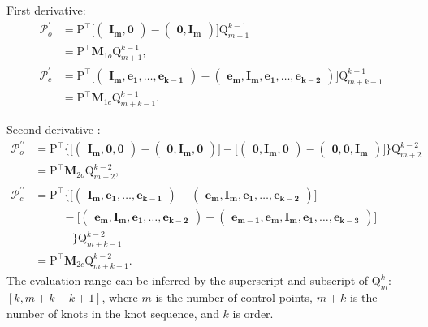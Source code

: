 \documentclass[11pt]{article}
\newcommand{\bmmp}{\bm{\mathcal{P}}} %
\newcommand{\vPT}{\bm{\mathrm{P}}^{\intercal}}
\newcommand{\vQ}{\bm{\mathrm{Q}}} %
\newcommand{\mM}{\mathbf{M}} %
\newcommand{\odml}{\begin{pmatrix}\bm{I_m},\bm{0}\end{pmatrix}}
\newcommand{\odmr}{\begin{pmatrix}\bm{0},\bm{I_m}\end{pmatrix}}
\newcommand{\cdml}{\begin{pmatrix}\bm{I_m},\bm{e_1},\dots,\bm{e_{k-1}}\end{pmatrix}}
\newcommand{\cdmr}{\begin{pmatrix}\bm{e_m},\bm{I_m},\bm{e_1},\dots,\bm{e_{k-2}}\end{pmatrix}}
\newcommand{\oddml}{\begin{pmatrix}\bm{I_m},\bm{0},\bm{0}\end{pmatrix}}
\newcommand{\oddmm}{\begin{pmatrix}\bm{0},\bm{I_m},\bm{0}\end{pmatrix}}
\newcommand{\oddmr}{\begin{pmatrix}\bm{0},\bm{0},\bm{I_m}\end{pmatrix}}
\newcommand{\cddml}{\begin{pmatrix}\bm{I_m},\bm{e_1},\dots,\bm{e_{k-1}}\end{pmatrix}}
\newcommand{\cddmm}{\begin{pmatrix}\bm{e_m},\bm{I_m},\bm{e_1},\dots,\bm{e_{k-2}}\end{pmatrix}}
\newcommand{\cddmr}{\begin{pmatrix}\bm{e_{m-1}},\bm{e_m},\bm{I_m},\bm{e_1},\dots,\bm{e_{k-3}}\end{pmatrix}}
\begin{document}
First derivative:
\[
\begin{split}
\bmmp_o^\prime &= \vPT \biggl[ \odml - \odmr \biggr] \vQ^{k-1}_{m+1} \\
&= \vPT \mM_{1o} \vQ^{k-1}_{m+1}, \\
\bmmp_c^\prime &= \vPT \biggl[ \cdml - \cdmr \biggr] \vQ^{k-1}_{m+k-1} \\
&= \vPT \mM_{1c} \vQ^{k-1}_{m+k-1}.
\end{split}
\]

Second derivative \label{second_derivative}:
\[
\begin{split}
\bmmp_o^{\prime\prime} &= \vPT \biggl\{
\biggl[ \oddml - \oddmm \biggr] 
-
\biggl[ \oddmm - \oddmr \biggr]
\biggr\}
\vQ^{k-2}_{m+2} \\
&= \vPT \mM_{2o} 
\vQ^{k-2}_{m+2},
\\
\bmmp_c^{\prime\prime} &= \vPT \biggl\{
\biggl[ \cddml - \cddmm \biggr] \\
&\mathrel{\phantom{=}}\quad\, -
\biggl[ \cddmm - \cddmr \biggr] \\
&\mathrel{\phantom{=}}\quad\quad \biggr\} \vQ^{k-2}_{m+k-1} \\
&= \vPT \mM_{2c} \vQ^{k-2}_{m+k-1}.
\end{split}
\]
The evaluation range can be inferred by the superscript and subscript of $\vQ^k_m$: $[k,m+k-k+1]$, where $m$ is the number of control points, $m+k$ is the number of knots in the knot sequence, and $k$ is order.
\end{document}
